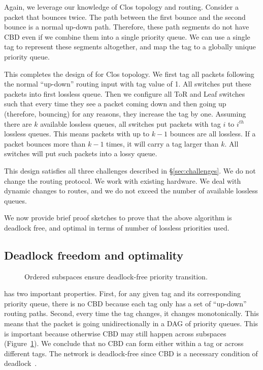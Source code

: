 Again, we leverage our knowledge of Clos topology and routing. Consider a packet
that bounces twice. The path between the first bounce and the second bounce is a
normal up-down path. Therefore, these path segments do not have CBD even if we
combine them into a single priority queue. We can use a single tag to represent
these segments altogether, and map the tag to a globally unique priority queue.

This completes the design of \sysname{} for Clos topology.  We first tag all
packets following the normal ``up-down'' routing input with tag value of 1. All
switches put these packets into first lossless queue. Then we configure all ToR
and Leaf switches such that every time they see a packet coming down and then
going up (therefore, bouncing) for any reasons, they increase the tag by one.
Assuming there are $k$ available lossless queues, all switches put packets with
tag $i$ to $i^{th}$ lossless queues. This means packets with up to $k-1$ bounces
are all lossless. If a packet bounces more than $k-1$ times, it will carry a tag
larger than $k$. All switches will put such packets into a lossy queue.

This design satisfies all three challenges described in
\S\ref{sec:challenges}. We do not change the routing protocol. We work with
existing hardware. We deal with dynamic changes to routes, and we do not exceed
the number of available lossless queues.

We now provide brief proof sketches to prove that the above algorithm is
deadlock free, and optimal in terms of number of lossless priorities used. 

\subsection {Deadlock freedom and optimality}

\begin{figure}[t]
	\centering
	
	
	\caption{Ordered subspaces ensure deadlock-free priority transition.}\label{fig:subspace}
\end{figure}

 \sysname{} has two important
properties. First, for any given tag and its corresponding priority queue, there
is no CBD because each tag only has a set of ``up-down'' routing paths.  Second,
every time the tag changes, it changes monotonically. This means that the packet
is going unidirectionally in a DAG of priority queues. This is important because
otherwise CBD may still happen across subspaces (Figure~\ref{fig:subspace}).  We
conclude that no CBD can form either within a tag or across different tags. The
network is deadlock-free since CBD is a necessary condition of
deadlock~\cite{our_hotnets_paper}.

